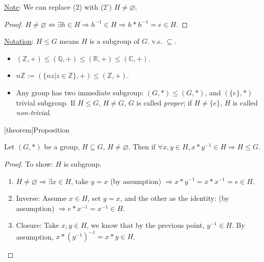 \documentclass[12pt]{report}
\theoremstyle{definition}
\begin{document}
\underline{Note}: We can replace (2) with (2') $H \neq \varnothing$.

\begin{proof}
    $H \neq \varnothing \iff \exists h \in H \Rightarrow{} h^{-1} \in H
    \Rightarrow{} h * h^{-1} = e \in H$.
\end{proof}

\underline{Notation}: $H \le G$ means $H$ is a subgroup of $G$.
v.s. $\subseteq$.

\begin{ex}
    \begin{itemize}
            \item  $(\mathbb{Z}, +) \le (\mathbb{Q}, +) \le (\mathbb{R}, +) \le (\mathbb{C}, +)$.
            \item $n\mathbb{Z} := (\{nz | z \in \mathbb{Z}\}, +) \le (\mathbb{Z}, +)$.
            \item Any group has two immediate subgroup: $(G, *) \le (G, *)$, and $(\{e\}, *)$ trivial subgroup.
                If $H \le G$, $H \neq G$, $G$ is called \emph{proper};
                if $H \neq \{e\}$, $H$ is called \emph{non-trivial}.
    \end{itemize}
    
   \end{ex}

[theorem]{Proposition}
\begin{subgroup test}
    Let $(G, *)$ be a group, $H \subseteq G$, $H \neq \varnothing$.
    Then if $\forall x, y \in H, x * y^{-1} \in H \Rightarrow{} H \le G$.
\end{subgroup test}

\begin{proof}
    To show: $H$ is subgroup.
    \begin{enumerate}
        \item $H \neq \varnothing \Rightarrow{} \exists x \in H$,
            take $y = x$ (by assumption) $\Rightarrow{} x*y^{-1} = x * x^{-1} = e \in H$.
        \item Inverse: Assume $x \in H$, set $y = x$, and the other as the identity:
            (by assumption) $\Rightarrow{} e * x^{-1} = x^{-1} \in H$.
        \item Closure: Take $x, y \in H$, we know that by the previous point, $y^{-1} \in H$.
        By assumption, $x * {(y^{-1})}^{-1} = x * y \in H$.
    \end{enumerate}
\end{proof}
\end{document}
